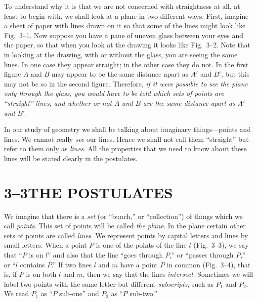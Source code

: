 \documentclass[11pt]{book}
\theoremstyle{bkplain}
\begin{document}
To understand why it is that we are not concerned with straightness at all, at
least to begin with, we shall look at a plane in two different ways. First,
imagine a sheet of paper with lines drawn on it so that some of the lines might
look like Fig.~3--1. Now suppose you have a pane of uneven glass between your
eyes and the paper, so that when you look at the drawing it looks like
Fig.~3--2. Note that in looking at the drawing, with or without the glass, you
are seeing the same lines. In one case they appear straight; in the other case
they do not. In the first figure $A$ and $B$ may appear to be the same distance
apart as $A'$ and $B'$, but this may not be so in the second figure. Therefore,
\emph{if it were possible to see the plane only through the glass, you would have
to be told which sets of points are ``straight'' lines, and whether or not $A$
and $B$ are the same distance apart as $A'$ and $B'$.}

\FIGIIIONETWO

In our study of geometry we shall be talking about imaginary things---points and
lines. We cannot really \emph{see} our lines. Hence we shall not call them
``straight'' but refer to them only as \emph{lines}. All the properties that we
need to know about these lines will be stated clearly in the postulates.

\section*{3--3\quad THE POSTULATES}

We imagine that there is a \emph{set} (or ``bunch,'' or ``collection'') of things
which we call \emph{points}. This set of points will be called \emph{the plane}.
In the plane certain other sets of points are called \emph{lines}. We represent
points by capital letters and lines by small letters. When a point $P$ is one of
the points of the line $l$ (Fig.~3--3), we say that ``$P$ is on $l$'' and also
that the line ``goes through $P$,'' or ``passes through $P$,'' or ``$l$ contains
$P$.'' If two lines $l$ and $m$ have a point $P$ in common (Fig.~3--4), that is,
if $P$ is on both $l$ and $m$, then we say that the lines \emph{intersect}.
Sometimes we will label two points with the same letter but different
\emph{subscripts}, such as $P_1$ and $P_2$. We read $P_1$ as ``$P$ sub-one'' and
$P_2$ as ``$P$ sub-two.''

\FIGIIITHREEFOURFIVE
\end{document}

